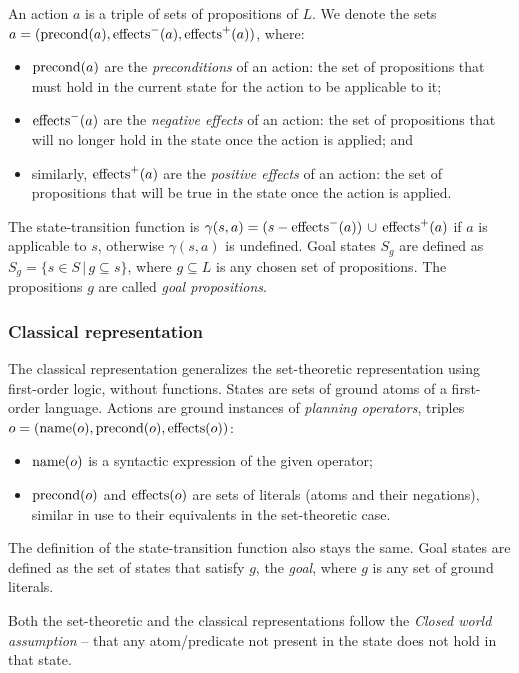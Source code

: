 An action $a$
is a triple of sets of propositions of $L$.
We denote the sets $a = (\operatorname{\textrm{precond}}(a), \operatorname{\textrm{effects}}^-(a), \operatorname{\textrm{effects}}^+(a))$, where:
\begin{itemize}
\item $\operatorname{\textrm{precond}}(a)$ are the \textit{preconditions} of an action: the set of
propositions that must hold in the current state for the action to be applicable to it;
\item $\operatorname{\textrm{effects}}^-(a)$ are the \textit{negative effects} of an action:
the set of propositions
that will no longer hold in the state once the action is applied; and
\item similarly, $\operatorname{\textrm{effects}}^+(a)$ are the \textit{positive effects} of an action:
the set of propositions that will be true in the state once the action is applied.
\end{itemize}

The state-transition function is $\gamma(s, a) = (s - \operatorname{\textrm{effects}}^-(a)) \,\cup\,
\operatorname{\textrm{effects}}^+(a)$ if $a$ is applicable to $s$,
otherwise $\gamma(s, a)$ is undefined. Goal states $S_g$ are defined as
$S_g = \{s \in S \,|\, g \subseteq s\}$, where
$g \subseteq L$ is any chosen set of propositions. The propositions $g$ are called
\textit{goal propositions}.

\subsubsection{Classical representation}

The classical representation generalizes the set-theoretic representation using first-order logic,
without functions.
States are sets of ground atoms of a first-order language.
Actions are ground instances of \textit{planning operators},
triples $o = (\operatorname{\textrm{name}}(o), \operatorname{\textrm{precond}}(o), \operatorname{\textrm{effects}}(o))$:

\begin{itemize}
\item $\operatorname{\textrm{name}}(o)$ is a syntactic expression of the given operator;
\item $\operatorname{\textrm{precond}}(o)$ and $\operatorname{\textrm{effects}}(o)$ are sets of literals
(atoms and their negations), similar in use to their equivalents
in the set-theoretic case.
\end{itemize}

The definition of the state-transition function also stays the same.
Goal states are defined as the set of states that satisfy $g$,
the \textit{goal}, where $g$ is any set of ground literals.

Both the set-theoretic and the classical representations follow the \textit{Closed world assumption} -- that any atom/predicate not present in the state does not hold in that state.

